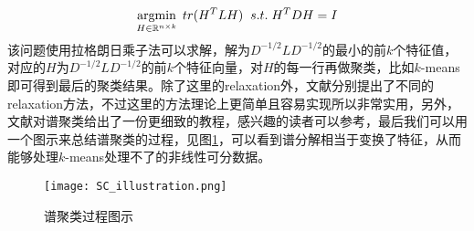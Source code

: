 \begin{equation}
    \label{eq: relax_spectral_clustering}
    \operatorname*{argmin}\limits_{H \in \mathbb{R}^{n \times k}} \; tr(H^TLH) \;\; s.t.\;H^TDH=I
\end{equation}
该问题使用拉格朗日乘子法可以求解，解为$D^{-1/2}LD^{-1/2}$的最小的前$k$个特征值，对应的$H$为$D^{-1/2}LD^{-1/2}$的前$k$个特征向量，对$H$的每一行再做聚类，比如$k$-means即可得到最后的聚类结果。除了这里的relaxation外，文献\cite{bie2006fast,bresson2013multiclass,rangapuram2014tight,rangapuram2016graph}分别提出了不同的relaxation方法，不过这里的方法理论上更简单且容易实现所以非常实用，另外，文献\cite{von2007tutorial}对谱聚类给出了一份更细致的教程，感兴趣的读者可以参考，最后我们可以用一个图示来总结谱聚类的过程，见图\ref{fig: SC_illustration}，可以看到谱分解相当于变换了特征，从而能够处理$k$-means处理不了的非线性可分数据。
\begin{figure}
    \texttt{[image: SC\_illustration.png]}
    \caption{谱聚类过程图示}
    \label{fig: SC_illustration}
\end{figure}